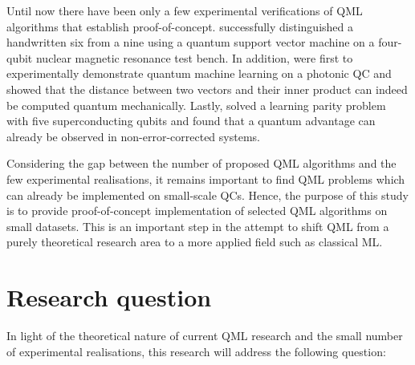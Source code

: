 Until now there have been only a few experimental verifications of QML algorithms that establish proof-of-concept.  successfully distinguished a handwritten six from a nine using a quantum support vector machine on a four-qubit nuclear magnetic resonance test bench. In addition,  were first to experimentally demonstrate quantum machine learning on a photonic QC and showed that the distance between two vectors and their inner product can indeed be computed quantum mechanically. Lastly,  solved a learning parity problem with five superconducting qubits and found that a quantum advantage can already be observed in non-error-corrected systems.

Considering the gap between the number of proposed QML algorithms and the few experimental realisations, it remains important to find QML problems which can already be implemented on small-scale QCs. Hence, the purpose of this study is to provide proof-of-concept implementation of selected QML algorithms on small datasets. This is an important step in the attempt to shift QML from a purely theoretical research area to a more applied field such as classical ML. 

\section{Research question}
\label{sec:researchquestion}






In light of the theoretical nature of current QML research and the small number of experimental realisations, this research will address the following question:

